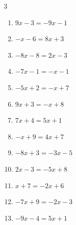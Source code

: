 \begin{multicols}{3}
\begin{enumerate}
        \phantom{$\displaystyle x=5$}

  \item $9x-3=-9x-1$


  \item $-x-6=8x+3$

        \phantom{$\displaystyle x=-1$}

  \item $-8x-8=2x-3$


  \item $-7x-1=-x-1$

        \phantom{$\displaystyle x=0$}

  \item $-5x+2=-x+7$


  \item $9x+3=-x+8$


  \item $7x+4=5x+1$


  \item $-x+9=4x+7$


  \item $-8x+3=-3x-5$


  \item $2x-3=-5x+8$


  \item $x+7=-2x+6$


\columnbreak %

  \item $-7x+9=-2x-3$


  \item $-9x-4=5x+1$



\end{enumerate}
\end{multicols}
